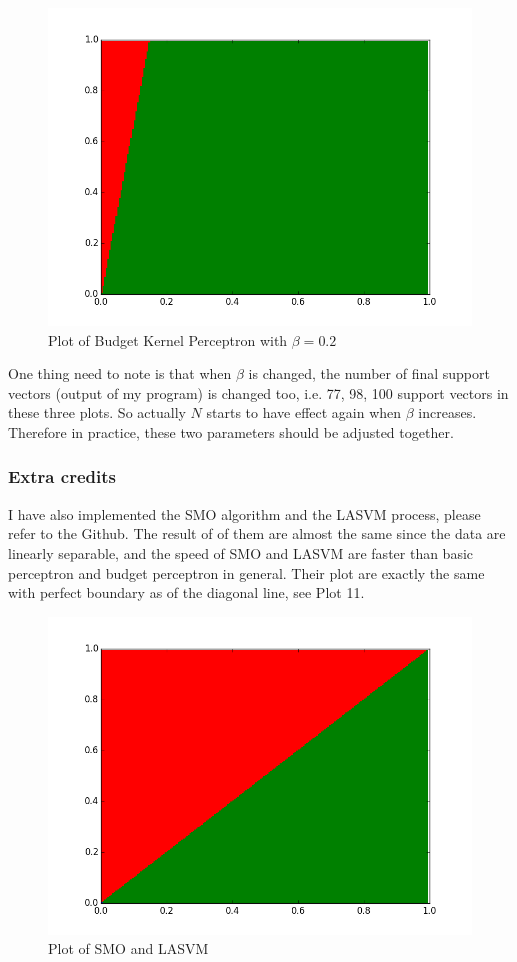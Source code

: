 \documentclass[submit]{harvardml}
\begin{document}
  \begin{figure}
     \centering
     \includegraphics[scale=0.3]{bk-beta015.png}
     \caption{Plot of Budget Kernel Perceptron with $\beta=0.2$}
 \end{figure}

One thing need to note is that when $\beta$ is changed, the number of final support vectors (output of my program) is changed too, i.e. 77, 98, 100 support vectors in these three plots. So actually $N$ starts to have effect again when $\beta$ increases. Therefore in practice, these two parameters should be adjusted together.

\subsubsection*{Extra credits}

I have also implemented the SMO algorithm and the LASVM process, please refer to the Github. The result of of them are almost the same since the data are linearly separable, and the speed of SMO and LASVM are faster than basic perceptron and budget perceptron in general. Their plot are exactly the same with perfect boundary as of the diagonal line, see Plot 11.

  \begin{figure}
     \centering
     \includegraphics[scale=0.3]{smo.png}
     \caption{Plot of SMO and LASVM}
 \end{figure}
\end{document}
